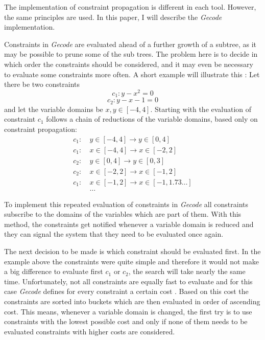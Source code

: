 \documentclass[10pt,
               a4paper,
               journal,
               ]{IEEEtran}
\begin{document}
	The implementation of constraint propagation is different in each tool. However, the same principles are used. In this paper, I will describe the \emph{Gecode} implementation.
	
	Constraints in \emph{Gecode} are evaluated ahead of a further growth of a subtree, as it may be possible to prune some of the sub trees. The problem here is to decide in which order the constraints should be considered, and it may even be necessary to evaluate some constraints more often. A short example will illustrate this \cite[p.~575]{handbookCP}: Let there be two constraints 
	\begin{equation}
		c_1: y - x^2 = 0
	\end{equation}
	\begin{equation}
		c_2: y - x - 1 = 0
		\label{eq:linear}
	\end{equation}
	and let the variable domains be $x, y \in [-4, 4]$. Starting with the evaluation of constraint $c_1$ follows a chain of reductions of the variable domains, based only on constraint propagation:
	\begin{equation}
	\begin{split}
		c_1:\ &y \in [-4, 4] \rightarrow y \in [0, 4] \\
		c_1:\ &x \in [-4, 4] \rightarrow x \in [-2, 2] \\
		c_2:\ &y \in [0, 4] \rightarrow y \in [0, 3] \\
		c_2:\ &x \in [-2, 2] \rightarrow x \in [-1, 2] \\
		c_1:\ &x \in [-1, 2] \rightarrow x \in [-1, 1.73 \dots] \\
		&\dots
	\end{split}
	\end{equation}
	
	To implement this repeated evaluation of constraints in \emph{Gecode} all constraints subscribe to the domains of the variables which are part of them. With this method, the constraints get notified whenever a variable domain is reduced and they can signal the system that they need to be evaluated once again.
	
	The next decision to be made is which constraint should be evaluated first. In the example above the constraints were quite simple and therefore it would not make a big difference to evaluate first $c_1$ or $c_2$, the search will take nearly the same time. Unfortunately, not all constraints are equally fast to evaluate and for this case \emph{Gecode} defines for every constraint a certain cost \cite[p.~275]{programmingGecode}. Based on this cost the constraints are sorted into buckets which are then evaluated in order of ascending cost. This means, whenever a variable domain is changed, the first try is to use constraints with the lowest possible cost and only if none of them needs to be evaluated constraints with higher costs are considered.
	
\end{document}
